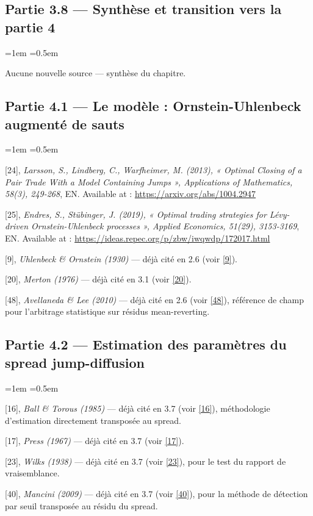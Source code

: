 \documentclass{article}
\begin{document}
\subsection*{Partie 3.8 --- Synthèse et transition vers la partie 4}
\begin{list}{}{\leftmargin=1em \itemsep=0.5em}
\item Aucune nouvelle source --- synthèse du chapitre.
\end{list}
\subsection*{Partie 4.1 --- Le modèle : Ornstein-Uhlenbeck augmenté de sauts}
\begin{list}{}{\leftmargin=1em \itemsep=0.5em}
\item \hypertarget{ref24}{} [24], \textit{Larsson, S., Lindberg, C., Warfheimer, M. (2013), « Optimal Closing of a Pair Trade With a Model Containing Jumps », Applications of Mathematics, 58(3), 249-268}, EN. Available at : \url{https://arxiv.org/abs/1004.2947}
\item \hypertarget{ref25}{} [25], \textit{Endres, S., Stübinger, J. (2019), « Optimal trading strategies for Lévy-driven Ornstein-Uhlenbeck processes », Applied Economics, 51(29), 3153-3169}, EN. Available at : \url{https://ideas.repec.org/p/zbw/iwqwdp/172017.html}
\item \hypertarget{ref9}{} [9], \textit{Uhlenbeck \& Ornstein (1930)} --- déjà cité en 2.6 (voir \hyperlink{ref9}{[9]}).
\item \hypertarget{ref20}{} [20], \textit{Merton (1976)} --- déjà cité en 3.1 (voir \hyperlink{ref20}{[20]}).
\item \hypertarget{ref48}{} [48], \textit{Avellaneda \& Lee (2010)} --- déjà cité en 2.6 (voir \hyperlink{ref48}{[48]}), référence de champ pour l'arbitrage statistique sur résidus mean-reverting.
\end{list}
\subsection*{Partie 4.2 --- Estimation des paramètres du spread jump-diffusion}
\begin{list}{}{\leftmargin=1em \itemsep=0.5em}
\item \hypertarget{ref16}{} [16], \textit{Ball \& Torous (1985)} --- déjà cité en 3.7 (voir \hyperlink{ref16}{[16]}), méthodologie d'estimation directement transposée au spread.
\item \hypertarget{ref17}{} [17], \textit{Press (1967)} --- déjà cité en 3.7 (voir \hyperlink{ref17}{[17]}).
\item \hypertarget{ref23}{} [23], \textit{Wilks (1938)} --- déjà cité en 3.7 (voir \hyperlink{ref23}{[23]}), pour le test du rapport de vraisemblance.
\item \hypertarget{ref40}{} [40], \textit{Mancini (2009)} --- déjà cité en 3.7 (voir \hyperlink{ref40}{[40]}), pour la méthode de détection par seuil transposée au résidu du spread.
\end{list}
\end{document}
